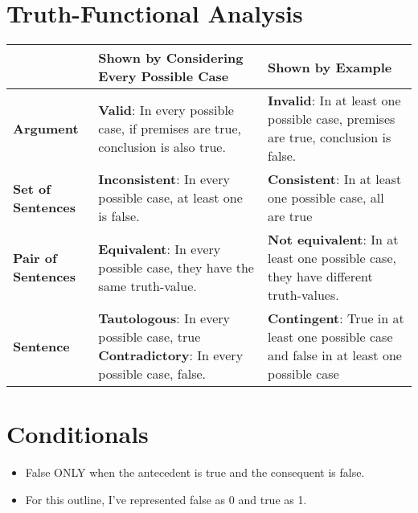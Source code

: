 \documentclass{report}
\begin{document}
	\section{Truth-Functional Analysis}
		\addtolength{\leftskip}{4em}
		\bgroup
		\def\arraystretch{1.5}%
		\small\begin{tabular}{ | l | p{7cm} | p{7cm} |}
			
			\hline
			  & \textbf{Shown by Considering Every Possible Case }& \textbf{Shown by Example}\\
			\hline
			\textbf{Argument} &
			\textbf{Valid}: In every possible case, if premises are true, conclusion is also true. &
			\textbf{Invalid}: In at least one possible case, premises are true, conclusion is false.\\
			
			\hline
			\textbf{Set of Sentences} &
			\textbf{Inconsistent}: In every possible case, at least one is false. & 
			\textbf{Consistent}: In at least one possible case, all are true\\
			
			\hline
			\textbf{Pair of Sentences} & 
			\textbf{Equivalent}: In every possible case, they have the same truth-value. & \textbf{Not equivalent}: In at least one possible case, they have different truth-values. \\
			
			\hline
			\textbf{Sentence} &
			\textbf{Tautologous}: In every possible case, true \newline
			\textbf{Contradictory}: In every possible case, false. & 
			\textbf{Contingent}: True in at least one possible case and false in at least one possible case\\
			\hline
		\end{tabular}
		\egroup
	\section{Conditionals}
		\begin{itemize}\addtolength{\leftskip}{4em}
			\item False ONLY when the antecedent is true and the consequent is false.
			\item For this outline, I've represented false as 0 and true as 1.
		\end{itemize}
		
\end{document}
